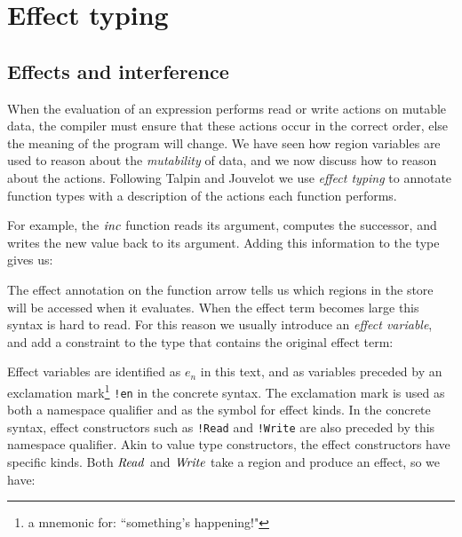 \clearpage
\section{Effect typing}
\label{System:Effects}

\subsection{Effects and interference}
\label{System:Effects:interference}
When the evaluation of an expression performs read or write actions on mutable data, the compiler must ensure that these actions occur in the correct order, else the meaning of the program will change. We have seen how region variables are used to reason about the \emph{mutability} of data, and we now discuss how to reason about the actions. Following Talpin and Jouvelot \cite{talpin:discipline} we use \emph{effect typing} to annotate function types with a description of the actions each function performs. 

For example, the $\operatorname{\mathit{inc}}$ function reads its argument, computes the successor, and writes the new value back to its argument. Adding this information to the type gives us:


The effect annotation on the function arrow tells us which regions in the store will be accessed when it evaluates. When the effect term becomes large this syntax is hard to read. For this reason we usually introduce an \emph{effect variable}, and add a constraint to the type that contains the original effect term:


Effect variables are identified as $e_n$ in this text, and as variables preceded by an exclamation mark\footnote{a mnemonic for: ``something's happening!"} \texttt{!en} in the concrete syntax. The exclamation mark is used as both a namespace qualifier and as the symbol for effect kinds. In the concrete syntax, effect constructors such as \texttt{!Read} and \texttt{!Write} are also preceded by this namespace qualifier. Akin to value type constructors, the effect constructors have specific kinds. Both $\operatorname{\mathit{Read}}$ and $\operatorname{\mathit{Write}}$ take a region and produce an effect, so we have:


